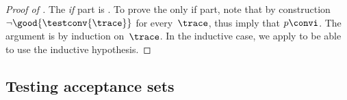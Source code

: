 {\begin{proof}[Proof of ]
  The \emph{if} part is .
  To prove the only if part,%
  note that by construction $\lnot \good{ \testconv{ \trace } }$ for every~$\trace$, thus
   imply that $p \convi$.
  The argument is by induction on~$\trace$. In the inductive case, we apply
  to be able to use the inductive hypothesis.
\end{proof}
\fi









\subsection{Testing acceptance sets}

\renewcommand{\state}{p}
\renewcommand{\stateA}{p'}

}
